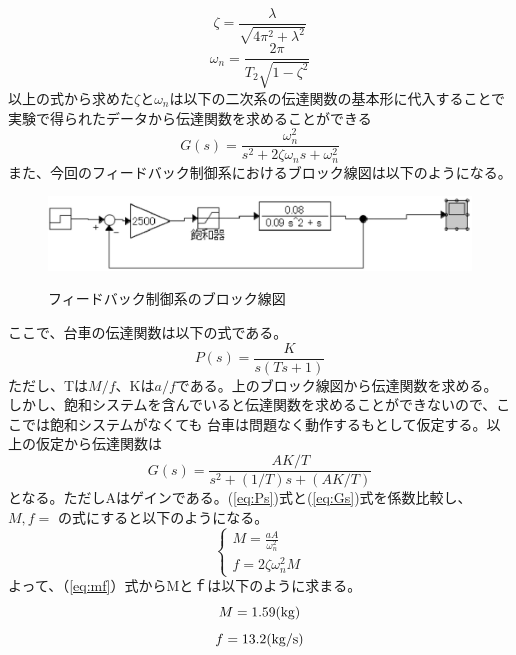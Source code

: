 		\begin{equation}
			\zeta=\frac{\lambda}{\sqrt{4\pi^{2}+\lambda^{2}}}
		\end{equation}
		\begin{equation}
			\omega_{n}=\frac{2\pi}{T_{2}\sqrt{1-\zeta^{2}}}
		\end{equation}
		以上の式から求めた$\zeta$と$\omega_{n}$は以下の二次系の伝達関数の基本形に代入することで
		実験で得られたデータから伝達関数を求めることができる
		\begin{equation}
			G(s) = \frac{\omega_{n}^{2}}{s^{2}+2\zeta\omega_{n}s + \omega_{n}^{2}}
		\end{equation}
		また、今回のフィードバック制御系におけるブロック線図は以下のようになる。
		\begin{figure}[H]
			\centering
			\includegraphics[width=1.0\linewidth]{gazo/FeedBackCart.eps}\\
			\caption{フィードバック制御系のブロック線図}
		\end{figure}
		ここで、台車の伝達関数は以下の式である。
		\begin{equation}
			P(s)=\frac{K}{s(Ts+1)}
			\label{eq:Ps}
		\end{equation}
		ただし、Tは$M/f$、Kは$a/f$である。上のブロック線図から伝達関数を求める。
		しかし、飽和システムを含んでいると伝達関数を求めることができないので、ここでは飽和システムがなくても
		台車は問題なく動作するもとして仮定する。以上の仮定から伝達関数は
		\begin{equation}
			G(s) = \frac{AK/T}{s^{2}+(1/T)s+(AK/T)}
			\label{eq:Gs}
		\end{equation}
		となる。ただしAはゲインである。(\ref{eq:Ps})式と(\ref{eq:Gs})式を係数比較し、$M,f=$
		の式にすると以下のようになる。
		\begin{equation}
			\left\{
			\begin{array}{l}
				M=\frac{aA}{\omega_{n}^{2}} \\
				f=2\zeta\omega_{n}^{2}M
			\end{array}
			\right.
			\label{eq:mf}
		\end{equation}
		よって、（\ref{eq:mf}）式からMとｆは以下のように求まる。
		\[
			M=1.59(\rm{kg})
		\]
		\[
			f=13.2(\rm{kg/s})
		\]
		
